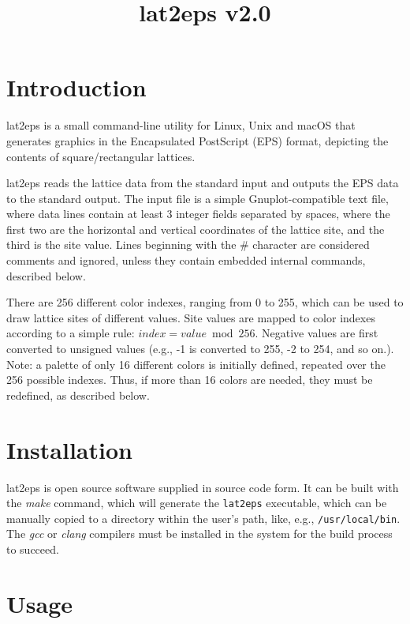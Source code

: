 \documentclass[a4paper]{article}
\title{\vspace{-5ex}lat2eps v2.0}
\author{}
\date{\vspace{-5ex}}
\begin{document}
\maketitle


\section{Introduction}

lat2eps is a small command-line utility for Linux, Unix and macOS that generates graphics in the Encapsulated PostScript (EPS) format, depicting the contents of square/rectangular lattices.
\bigbreak

lat2eps reads the lattice data from the standard input and outputs the EPS data to the standard output. The input file is a simple Gnuplot-compatible text file, where data lines contain at least 3 integer fields separated by spaces, where the first two are the horizontal and vertical coordinates of the lattice site, and the third is the site value. Lines beginning with the \# character are considered comments and ignored, unless they contain embedded internal commands, described below.
\bigbreak

There are 256 different color indexes, ranging from 0 to 255, which can be used to draw lattice sites of different values. Site values are mapped to color indexes according to a simple rule: $index = value \bmod 256$. Negative values are first converted to unsigned values (e.g., -1 is converted to 255, -2 to 254, and so on.). Note: a palette of only 16 different colors is initially defined, repeated over the 256 possible indexes. Thus, if more than 16 colors are needed, they must be redefined, as described below.
\bigbreak


\section{Installation}

lat2eps is open source software supplied in source code form. It can be built with the \textit{make} command, which will generate the \texttt{lat2eps} executable, which can be manually copied to a directory within the user's path, like, e.g., \texttt{/usr/local/bin}. The \textit{gcc} or \textit{clang} compilers must be installed in the system for the build process to succeed.
\bigbreak


\section{Usage}
\end{document}

